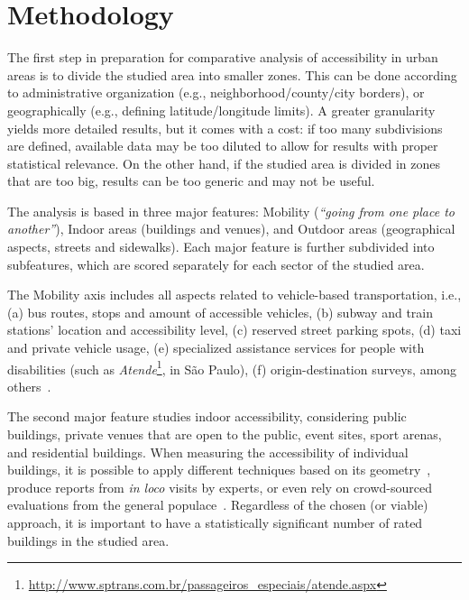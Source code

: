 \documentclass[12pt]{article}
\begin{document}

\section{Methodology}
\label{sec:methodology}
The first step in preparation for comparative analysis of accessibility in urban areas
is to divide the studied area into smaller zones.
This can be done according to administrative organization
(e.g., neighborhood/county/city borders),
or geographically (e.g., defining latitude/longitude limits).
A greater granularity yields more detailed results, but it comes with a cost:
if too many subdivisions are defined, available data may be too diluted to allow for results with proper statistical relevance.
On the other hand, if the studied area is divided in zones that are too big, results can be too generic and may not be useful.

The analysis is based in three major features:
Mobility (\emph{``going from one place to another''}),
Indoor areas (buildings and venues),
and Outdoor areas (geographical aspects, streets and sidewalks).
Each major feature is further subdivided into subfeatures,
which are scored separately for each sector of the studied area.

The Mobility axis includes all aspects related to vehicle-based transportation,
i.e.,
(a) bus routes, stops and amount of accessible vehicles,
(b) subway and train stations' location and accessibility level,
(c) reserved street parking spots,
(d) taxi and private vehicle usage,
(e) specialized assistance services for people with disabilities (such as \emph{Atende}\footnote{\url{http://www.sptrans.com.br/passageiros_especiais/atende.aspx}}, in São Paulo),
(f) origin-destination surveys,
among others~\cite{Pirie:1979, Niemeier}.

The second major feature studies indoor accessibility,
considering public buildings, private venues that are open to the public,
event sites, sport arenas, and residential buildings.
When measuring the accessibility of individual buildings,
it is possible to apply different techniques based on its geometry~\cite{jeonnongindoor, thill2011traveling, vanclooster2012measuring},
produce reports from \emph{in loco} visits by experts,
or even rely on crowd-sourced evaluations from the general populace~\cite{guiaderodas}.
Regardless of the chosen (or viable) approach,
it is important to have a statistically significant number of rated buildings in the studied area.
\end{document}
